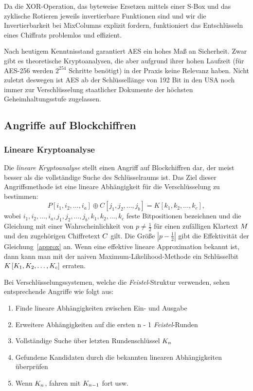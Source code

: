 Da die XOR-Operation, das byteweise Ersetzen mittels einer S-Box und das zyklische Rotieren jeweils invertierbare Funktionen sind und wir die Invertierbarkeit bei MixColumns explizit fordern, funktioniert das Entschlüsseln eines Chiffrats problemlos und effizient.

Nach heutigem Kenntnisstand garantiert AES ein hohes Maß an Sicherheit. Zwar gibt es theoretische Kryptoanalysen, die aber aufgrund ihrer hohen Laufzeit (für AES-256 werden $2^{254}$ Schritte benötigt) in der Praxis keine Relevanz haben. Nicht zuletzt deswegen ist AES ab der Schlüssellänge von 192 Bit in den USA noch immer zur Verschlüsselung staatlicher Dokumente der höchsten Geheimhaltungsstufe zugelassen.

\subsection{Angriffe auf Blockchiffren}

\subsubsection{Lineare Kryptoanalyse}
\label{sssec:linKryptoanalyse}
Die \textit{lineare Kryptoanalyse} stellt einen Angriff auf Blockchiffren dar, der meist besser als die vollständige Suche des Schlüsselraums ist. Das Ziel dieser Angriffsmethode ist eine lineare Abhängigkeit für die Verschlüsselung zu bestimmen:
\begin{equation}
	P \left[ i_1, i_2, \ldots, i_a \right] \oplus C \left[ j_1, j_2, \ldots, j_b \right]  = K \left[ k_1, k_2, \ldots, k_c \right], \label{approx}
\end{equation}
wobei  $i_1, i_2, \ldots, i_a, j_1, j_2, \ldots, j_b,k_1, k_2, \ldots, k_c$ feste Bitpositionen bezeichnen und die Gleichung mit einer Wahrscheinlichkeit von
$p\neq \frac{1}{2}$ für einen zufälligen Klartext $M$ und den zugehörigen Chiffretext $C$ gilt. Die Größe $\left|{p-\frac{1}{2}}\right|$ gibt die
Effektivität der Gleichung~\ref{approx} an. Wenn eine effektive lineare Approximation bekannt ist, dann kann man mit der naiven Maximum-Likelihood-Methode ein
Schlüsselbit $K \left[ K_1, K_2, \ldots, K_c \right]$ erraten.

Bei Verschlüsselungssystemen, welche die \textit{Feistel}-Struktur verwenden, sehen entsprechende Angriffe wie folgt aus:
\begin{enumerate}
	\item Finde lineare Abhängigkeiten zwischen Ein- und Ausgabe
	\item Erweitere Abhängigkeiten auf die ersten n - 1 \textit{Feistel}-Runden
	\item Vollständige Suche über letzten Rundenschlüssel $K_n$
	\item Gefundene Kandidaten durch die bekannten linearen Abhängigkeiten überprüfen
	\item Wenn $K_n$, fahren mit $K_{n-1}$ fort usw.
\end{enumerate}

